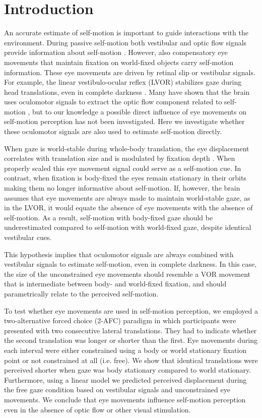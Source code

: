 \section{Introduction}

An accurate estimate of self-motion is important to guide interactions with the environment. During passive self-motion both vestibular and optic flow signals provide information about self-motion \cite{gibson1955, benson1986, harris2000, israel1989, angelaki2005, carriot2013, chen2010}. However, also compensatory eye movements that maintain fixation on world-fixed objects carry self-motion information. These eye movements are driven by retinal slip or vestibular signals. For example, the linear vestibulo-ocular reflex (LVOR) stabilizes gaze during head translations, even in complete darkness \cite{paige1989,medendorp2002,angelaki2004}.  Many have shown that the brain uses oculomotor signals to extract the optic flow component related to self-motion \cite{warren1988, royden1992, freeman1998, lappe1999}, but to our knowledge a possible direct influence of eye movements on self-motion perception has not been investigated. Here we investigate whether these oculomotor signals are also used to estimate self-motion directly.

When gaze is world-stable during whole-body translation, the eye displacement correlates with translation size and is modulated by fixation depth \cite{schwarz1989, paige1998, mchenry2000, medendorp2002}. When properly scaled this eye movement signal could serve as a self-motion cue. In contrast, when fixation is body-fixed the eyes remain stationary in their orbits \cite{paige1998, ramat2005} making them no longer informative about self-motion. If, however, the brain assumes that eye movements are always made to maintain world-stable gaze, as in the LVOR, it would equate the absence of eye movements with the absence of self-motion. As a result, self-motion with body-fixed gaze should be underestimated compared to self-motion with world-fixed gaze, despite identical vestibular cues.

 This hypothesis implies that oculomotor signals are always combined with vestibular signals to estimate self-motion, even in complete darkness.  In this case, the size of the unconstrained eye movements should resemble a VOR movement that is intermediate between body- and world-fixed fixation, and should parametrically relate to the perceived self-motion.

To test whether eye movements are used in self-motion perception, we employed a two-alternative forced choice (2-AFC) paradigm in which participants were presented with two consecutive lateral translations. They had to indicate whether the second translation was longer or shorter than the first. Eye movements during each interval were either constrained using a  body or world stationary fixation point or not constrained at all (i.e. free). We show that identical translations were perceived shorter when gaze was body stationary compared to world stationary. Furthermore, using a linear model we predicted perceived displacement during the free gaze condition based on vestibular signals and unconstrained eye movements. We conclude that eye movements influence self-motion perception even in the absence of optic flow or other visual stimulation. 
